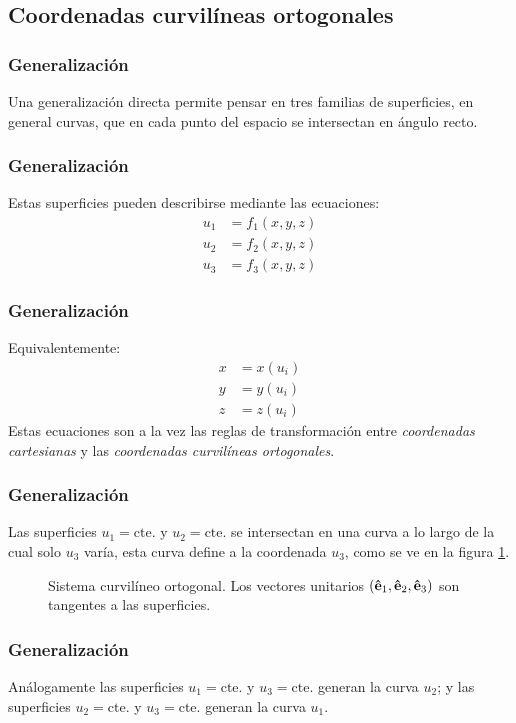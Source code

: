 \documentclass[12pt]{beamer}
\begin{document}
\subsection{Coordenadas curvilíneas ortogonales}

\begin{frame}
\frametitle{Generalización}
Una generalización directa permite pensar en tres familias de superficies, en general curvas, que en cada punto del espacio se intersectan en ángulo recto.
\end{frame}
\begin{frame}
\frametitle{Generalización}
Estas superficies pueden describirse mediante las ecuaciones:
\begin{align*}
u_{1} &= f_{1}(x, y, z) \\
u_{2} &= f_{2}(x, y, z) \\
u_{3} &= f_{3}(x, y, z)
\end{align*}
\end{frame}
\begin{frame}
\frametitle{Generalización}
Equivalentemente:
\begin{align*}
x &= x(u_{i}) \\
y &= y(u_{i}) \\
z &= z(u_{i})
\end{align*}
\pause
Estas ecuaciones son a la vez las reglas de transformación entre \emph{coordenadas cartesianas} y las \emph{coordenadas curvilíneas ortogonales}.
\end{frame}
\begin{frame}
\frametitle{Generalización}
Las superficies $u_{1} = \mbox{cte.}$ y $u_{2} = \mbox{cte.}$ se intersectan en una curva a lo largo de la cual solo $u_{3}$ varía, esta curva define a la coordenada $u_{3}$, como se ve en la figura \ref{fig:figura_Sistema_Curvilineo_Ortogonal}.
\end{frame}
\begin{frame}
\begin{figure}[h!]
   \centering
   
   \caption{Sistema curvilíneo ortogonal. Los vectores unitarios $(\vu{e}_{1}, \vu{e}_{2}, \vu{e}_{3})$ son tangentes a las superficies.}
   \label{fig:figura_Sistema_Curvilineo_Ortogonal}
\end{figure}
\end{frame}
\begin{frame}
   \frametitle{Generalización}
Análogamente las superficies $u_{1} = \mbox{cte.}$ y $u_{3} = \mbox{cte.}$ generan la curva $u_{2}$; y las superficies $u_{2} = \mbox{cte.}$ y $u_{3} = \mbox{cte.}$ generan la curva $u_{1}$.
\end{frame}
\end{document}
